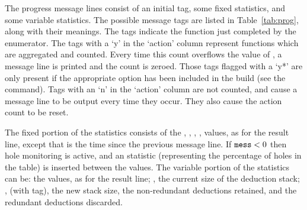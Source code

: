 The progress message lines consist of an initial tag, some fixed
  statistics, and some variable statistics.
The possible message tags are listed in Table~\ref{tab:prog}, along
  with their meanings.
The tags indicate the function just completed by the enumerator.
The tags with a `y' in the `action' column represent functions which are
  aggregated and counted.
Every time this count overflows the value of , a message line
  is printed and the count is zeroed.
Those tags flagged with a `y*' are only present if the appropriate option
  has been included in the build (see the  command).
Tags with an `n' in the `action' column are not counted, and cause a
  message line to be output every time they occur.
They also cause the action count to be reset.

The fixed portion of the statistics consists of the , , 
  , ,  \amp {} values, as for the
  result line, except that  is the time since the previous message
  line. 
If $\texttt{mess} < 0$ then hole monitoring is active, and an 
  statistic (representing the percentage of holes in the table) is inserted
  between the  \amp {} values.
The variable portion of the statistics can be:
  the  \amp {} values, as for the result line;
  , the current size of the deduction stack;
  ,  \amp {} (with  tag), the new stack size,
    the non-redundant deductions retained, and the redundant deductions
    discarded.


